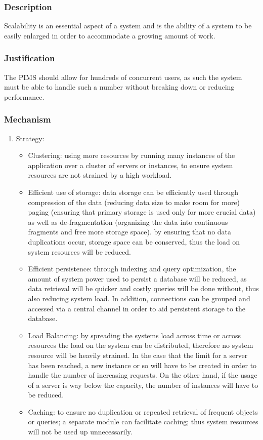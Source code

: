 	\subsubsection*{Description}
	Scalability is an essential aspect of a system and is the ability of a system to be easily enlarged in order to accommodate a growing amount of work.
	\subsubsection*{Justification}
	 The PIMS should allow for hundreds of concurrent users, as such the system must be able to handle such a number without breaking down or reducing performance.
	\subsubsection*{Mechanism}
		\begin{enumerate}
			\item Strategy:
			\begin{itemize}
			\item Clustering: using more resources by running many instances of the application over a cluster of servers or instances, to ensure system resources are not strained by a high workload.
			
			\item Efficient use of storage: data storage can be efficiently used through compression of the data (reducing data size to make room for more) paging (ensuring that primary storage is used only for more crucial data) as well as de-fragmentation (organizing the data into continuous fragments and free more storage space).
			by ensuring that no data duplications occur, storage space can be conserved, thus the load on system resources will be reduced.
			\item Efficient persistence: through indexing and query optimization, the amount of system power used to persist a database will be reduced, as data retrieval will be quicker and costly queries will be done without, thus also reducing system load. In addition, connections can be grouped and accessed via a central channel in order to aid persistent storage to the database.
			
			\item Load Balancing: by spreading the systems load across time or across resources the load on the system can be distributed, therefore no system resource will be heavily strained. In the case that the limit for a server has been reached, a new instance or so will have to be created in order to handle the number of increasing requests. On the other hand, if the usage of a server is way below the capacity, the number of instances will have to be reduced.
			
			\item Caching: to ensure no duplication or repeated retrieval of frequent objects or queries; a separate module can facilitate caching; thus system resources will not be used up unnecessarily.
			 \end{itemize}

		\end{enumerate}